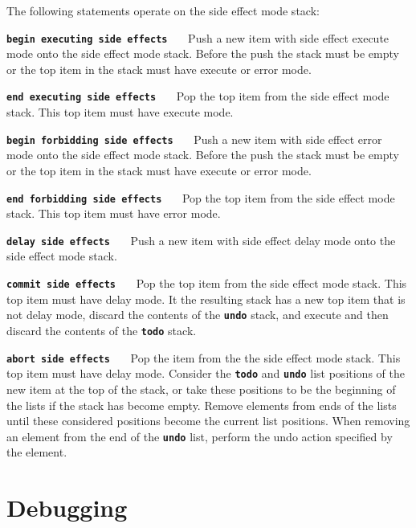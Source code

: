 \documentclass[12pt]{article}
\makeatletter
\newcommand{\TT}[1]{{\tt \bfseries #1}}
\newcommand{\ttlkey}[2]{\TT{#1 #2}\index{#1@{\tt #1}!#2@{\tt #2}}}
\makeatother
\begin{document}
The following statements operate on the side effect mode stack:

\begin{list}{}{}
\item[\ttlkey{begin executing}{side effects}]~~~Push a new item with side effect
execute mode onto the side effect mode stack.  Before the push the
stack must be empty or the top item in the stack must have execute or
error mode.

\item[\ttlkey{end executing}{side effects}]~~~Pop the top item from
the side effect mode stack.  This top item must have
execute mode.

\item[\ttlkey{begin forbidding}{side effects}]~~~Push
a new item with side effect
error mode onto the side effect mode stack.  Before the push the
stack must be empty or the top item in the stack must have execute or
error mode.

\item[\ttlkey{end forbidding}{side effects}]~~~Pop the top item from the
side effect mode stack.  This top item must have
error mode.

\item[\ttlkey{delay}{side effects}]~~~Push a new item with side effect
delay mode onto the side effect mode stack.

\item[\ttlkey{commit}{side effects}]~~~Pop the top item from the
side effect mode stack.  This top item must have
delay mode.  It the resulting stack has a new top item that is not
delay mode, discard the contents of the \TT{undo} stack, and execute
and then discard the contents of the \TT{todo} stack.

\item[\ttlkey{abort side}{effects}]~~~Pop the item from the
the side effect mode stack.  This top item must have
delay mode.  Consider the \TT{todo} and \TT{undo} list positions
of the new item at the top of the stack, or take these positions to be
the beginning of the lists if the stack has become empty.  Remove
elements from ends of the lists until these considered positions become
the current list positions.  When removing an element from the end of the
\TT{undo} list, perform the undo action specified by the element.

\end{list}

\section{Debugging}
\end{document}
